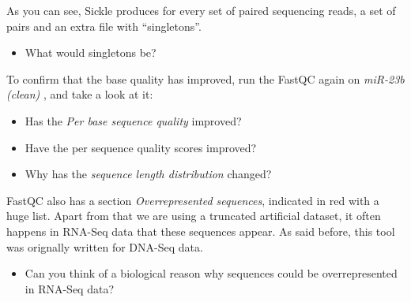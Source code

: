 As you can see, Sickle produces for every set of paired sequencing reads, a set of pairs and an extra file with ``singletons''.
\begin{itemize}
	\item What would singletons be?
\end{itemize}
To confirm that the base quality has improved, run the FastQC again on \textit{ miR-23b (clean) }, and take a look at it:
\begin{itemize}
	\item Has the \textit{Per base sequence quality} improved?
	\item Have the per sequence quality scores improved?
	\item Why has the \textit{sequence length distribution} changed?
\end{itemize}
FastQC also has a section \textit{Overrepresented sequences}, indicated in red with a huge list. Apart from that we are using a truncated artificial dataset, it often happens in RNA-Seq data that these sequences appear. As said before, this tool was orignally written for DNA-Seq data.
\begin{itemize}
	\item Can you think of a biological reason why sequences could be overrepresented in RNA-Seq data?
\end{itemize}